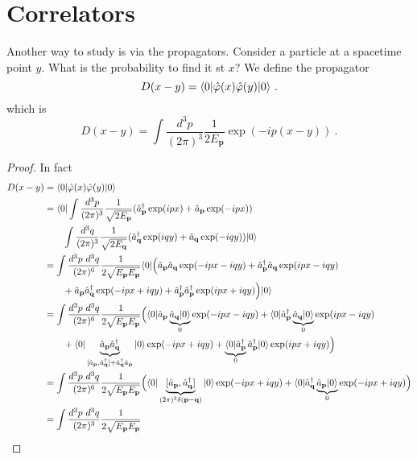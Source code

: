 \section{Correlators}

    Another way to study is via the propagators. Consider a particle at a spacetime point $y$. What is the probability to find it st $x$? We define the propagator 
    \begin{equation*}
        D(x - y) = \langle0\vert \hat \varphi (x) \hat \varphi (y) \vert0\rangle ~.
    \end{equation*}
    which is 
    \begin{equation}
        D(x-y) = \int \frac{d^3 p}{(2\pi)^3} \frac{1}{2 E_{\mathbf p}} \exp(- i p (x - y)) ~.
    \end{equation}
    \begin{proof}
        In fact 
        \begin{equation*}
        \begin{aligned}
            D(x- y) & = \bra{0} \hat \varphi (x) \hat \varphi (y) \ket{0} \\ & = \bra{0} \int \frac{d^3 p}{(2\pi)^3} \frac{1}{\sqrt{2 E_{\mathbf p}}} (\hat a^\dagger_{\mathbf p} \exp(i p x) + \hat a_{\mathbf p} \exp(-i p x)) \\ & \qquad \int \frac{d^3 q}{(2\pi)^3} \frac{1}{\sqrt{2 E_{\mathbf q}}} (\hat a^\dagger_{\mathbf q} \exp(i q y) + \hat a_{\mathbf q} \exp(-i q y)) \ket{0} \\ & = \int \frac{d^3 p ~ d^3 q}{(2\pi)^6} \frac{1}{2 \sqrt{E_{\mathbf p} E_{\mathbf p}}} \bra{0} \Big ( \hat a_{\mathbf p} \hat a_{\mathbf q} \exp (- i p x - i q y) + \hat a_{\mathbf p}^\dagger \hat a_{\mathbf q} \exp (i p x - i q y) \\ & \qquad + \hat a_{\mathbf p} \hat a_{\mathbf q}^\dagger \exp (- i p x + i q y) + \hat a_{\mathbf p}^\dagger \hat a_{\mathbf p}^\dagger \exp (i p x + i q y) \Big) \ket{0} \\ & = \int \frac{d^3 p ~ d^3 q}{(2\pi)^6} \frac{1}{2 \sqrt{E_{\mathbf p} E_{\mathbf p}}} \Big ( \bra{0} \hat a_{\mathbf p} \underbrace{\hat a_{\mathbf q} \ket{0}}_0 \exp (- i p x - i q y) + \bra{0} \hat a_{\mathbf p}^\dagger \underbrace{\hat a_{\mathbf q} \ket{0}}_0  \exp (i p x - i q y) \\ & \qquad + \bra{0} \underbrace{\hat a_{\mathbf p} \hat a_{\mathbf q}^\dagger}_{[\hat a_{\mathbf p}, \hat a_{\mathbf q}^\dagger] + \hat a_{\mathbf q}^\dagger \hat a_{\mathbf p}} \ket{0} \exp (- i p x + i q y) + \underbrace{\bra{0} \hat a_{\mathbf p}^\dagger}_0 \hat a_{\mathbf p}^\dagger \ket{0}  \exp (i p x + i q y) \Big) \\ & = \int \frac{d^3 p ~ d^3 q}{(2\pi)^6} \frac{1}{2 \sqrt{E_{\mathbf p} E_{\mathbf p}}} \Big (\bra{0} \underbrace{[\hat a_{\mathbf p}, \hat a_{\mathbf q}^\dagger]}_{(2\pi)^3 \delta (\mathbf p - \mathbf q)} \ket{0} \exp (- i p x + i q y) + \bra{0} \hat a_{\mathbf q}^\dagger \underbrace{\hat a_{\mathbf p} \ket{0}}_0 \exp (- i p x + i q y) \Big ) \\ & = \int \frac{d^3 p ~ d^3 q}{(2\pi)^3} \frac{1}{2 \sqrt{E_{\mathbf p} E_{\mathbf p}}} 

\end{aligned}
\end{equation*}
\end{proof}
